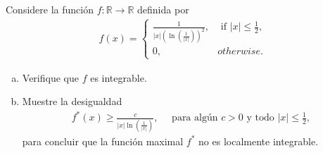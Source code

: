 \begin{homeworkProblem}
  Considere la función $f:\mathbb{R}\to \mathbb{R}$ definida por
  \begin{align*}
    f(x)= 
    \begin{cases}
      \frac{1}{|x|\left(\ln\left(\frac{1}{|x|}\right)\right)^{2}}, &\text{ if } |x|\leq \frac{1}{2} \text{,} \\
      0, &\text{} otherwise .
    \end{cases}
  \end{align*}
  \begin{enumerate}[a)]
    \item Verifique que $f$ es integrable.
    \item Muestre la desigualdad
      \begin{align*}
        f^{\ast}(x)\geq \frac{c}{|x|\ln\left( \frac{1}{|x|} \right)},\quad\text{ para algún $c>0$ y todo $|x|\leq \frac{1}{2}$},
      \end{align*}
      para concluir que la función maximal $f^{\ast}$ no es localmente integrable.
  \end{enumerate}
\end{homeworkProblem}
